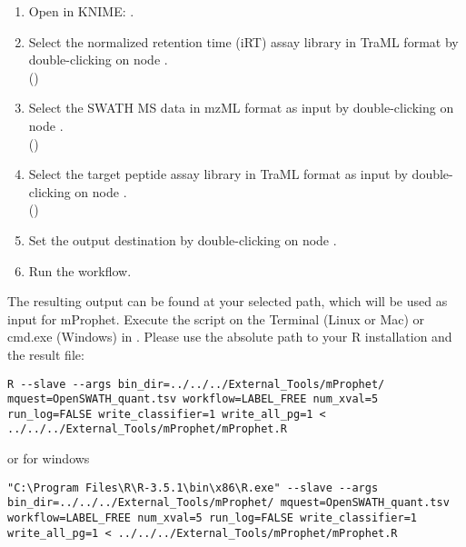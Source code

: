 \begin{enumerate}
  \item Open  in KNIME: .
  \item Select the normalized retention time (iRT) assay library in TraML format by double-clicking on node .\\
  ()
  \item Select the SWATH MS data in mzML format as input by double-clicking on node .\\
  ()
  \item Select the target peptide assay library in TraML format  as input by double-clicking on node .\\
  ()
  \item Set the output destination by double-clicking on node .\\
  \item Run the workflow.
\end{enumerate}

\noindent The resulting output can be found at your selected path, which will be used as input for mProphet. Execute the script on the Terminal (Linux or Mac) or cmd.exe (Windows) in . Please use the absolute path to your R installation and the result file:

\begin{listing}
\begin{verbatim}
R --slave --args bin_dir=../../../External_Tools/mProphet/ mquest=OpenSWATH_quant.tsv workflow=LABEL_FREE num_xval=5 run_log=FALSE write_classifier=1 write_all_pg=1 < ../../../External_Tools/mProphet/mProphet.R
\end{verbatim}
\end{listing}
or for windows
\begin{listing}
\begin{verbatim}
"C:\Program Files\R\R-3.5.1\bin\x86\R.exe" --slave --args bin_dir=../../../External_Tools/mProphet/ mquest=OpenSWATH_quant.tsv workflow=LABEL_FREE num_xval=5 run_log=FALSE write_classifier=1 write_all_pg=1 < ../../../External_Tools/mProphet/mProphet.R
\end{verbatim}
\end{listing}

